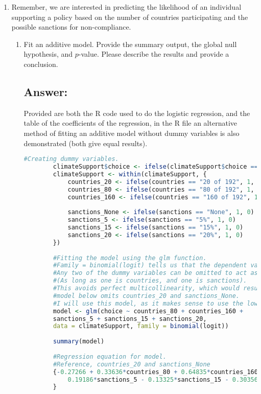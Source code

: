 \documentclass[12pt,letterpaper]{article}
\begin{document}
\begin{enumerate}
	\item
	Remember, we are interested in predicting the likelihood of an individual supporting a policy based on the number of countries participating and the possible sanctions for non-compliance.
	\begin{enumerate}
		\item [] Fit an additive model. Provide the summary output, the global null hypothesis, and $p$-value. Please describe the results and provide a conclusion.
		\subsection*{Answer:}
		
		Provided are both the R code used to do the logistic regression, and the table of the coefficients of the regression, in the R file an alternative method of fitting an additive model without dummy variables is also demonstrated (both give equal results).
		
		\vspace{0.5cm}
		
		\begin{lstlisting}[language=R]
		#Creating dummy variables.
		climateSupport$choice <- ifelse(climateSupport$choice == "Supported", 1, 0)
		climateSupport <- within(climateSupport, {
			countries_20 <- ifelse(countries == "20 of 192", 1, 0)
			countries_80 <- ifelse(countries == "80 of 192", 1, 0)
			countries_160 <- ifelse(countries == "160 of 192", 1, 0)
			
			sanctions_None <- ifelse(sanctions == "None", 1, 0)
			sanctions_5 <- ifelse(sanctions == "5%", 1, 0)
			sanctions_15 <- ifelse(sanctions == "15%", 1, 0)
			sanctions_20 <- ifelse(sanctions == "20%", 1, 0)
		})
		
		#Fitting the model using the glm function.
		#Family = binomial(logit) tells us that the dependent variable is binary.
		#Any two of the dummy variables can be omitted to act as the reference.
		#(As long as one is countries, and one is sanctions).
		#This avoids perfect multicollinearity, which would result in NAs.
		#model below omits countries_20 and sanctions_None.
		#I will use this model, as it makes sense to use the lowest values as the reference.
		model <- glm(choice ~ countries_80 + countries_160 +
		sanctions_5 + sanctions_15 + sanctions_20, 
		data = climateSupport, family = binomial(logit))
		
		summary(model)
		
		#Regression equation for model.
		#Reference, countries_20 and sanctions_None
		{-0.27266 + 0.33636*countries_80 + 0.64835*countries_160 +
			0.19186*sanctions_5 - 0.13325*sanctions_15 - 0.30356*sanctions_20 
		}        
		\end{lstlisting}
		

\end{enumerate}
\end{enumerate}
\end{document}
